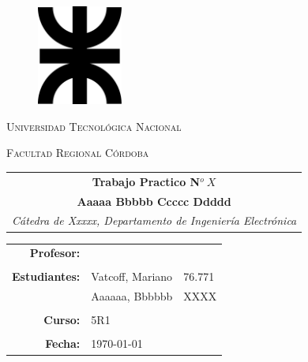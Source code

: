 \begin{titlepage}
		\centering
		\vspace{5cm}
		\begin{figure}[h]
			\centering
			\includegraphics[width=2.8cm]{Imagenes/utn_logo.pdf}
		\end{figure}

		{\scshape\LARGE Universidad Tecnológica Nacional \par}
		{\scshape\Large Facultad Regional Córdoba\par}
		\vspace{3cm}
		
		\begin{tabular}{c}
			\LARGE \textbf{Trabajo Practico N$^o \ X$}\\
			\LARGE \textbf{Aaaaa Bbbbb Ccccc Ddddd}\\
			\hline
			\textit{Cátedra de Xxxxx, Departamento de Ingeniería Electrónica}\\
		\end{tabular}
		
		\vspace{7cm}
		\begin{tabular}{rll}
            \Large \textbf{Profesor:} & \Large \\
            						  & \Large 
            
            \vspace{0.5cm}\\
            
           \Large \textbf{Estudiantes:} 
           & \Large Vatcoff, Mariano & \Large 76.771\\
           & \Large Aaaaaa, Bbbbbb & \Large XXXX\\
           \vspace{0.5cm}\\
            
            \Large \textbf{Curso:} & \Large 5R1 \\
            \vspace{0.5cm}\\
            \Large \textbf{Fecha:} & \Large \today  \\   
        \end{tabular}
\end{titlepage}